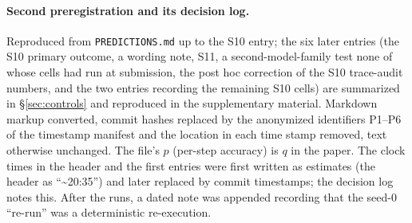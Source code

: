 \documentclass{article}
\theoremstyle{definition}
\begin{document}
\paragraph{Second preregistration and its decision log.} Reproduced from \texttt{PREDICTIONS.md} up to the S10 entry; the six later entries (the S10 primary outcome, a wording note, S11, a second-model-family test none of whose cells had run at submission, the post hoc correction of the S10 trace-audit numbers, and the two entries recording the remaining S10 cells) are summarized in \S\ref{sec:controls} and reproduced in the supplementary material. Markdown markup converted, commit hashes replaced by the anonymized identifiers P1--P6 of the timestamp manifest and the location in each time stamp removed, text otherwise unchanged. The file's $p$ (per-step accuracy) is $q$ in the paper. The clock times in the header and the first entries were first written as estimates (the header as ``\textasciitilde20:35'') and later replaced by commit timestamps; the decision log notes this. After the runs, a dated note was appended recording that the seed-0 ``re-run'' was a deterministic re-execution.
\end{document}

